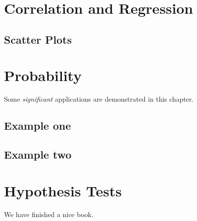 \documentclass[]{book}
\begin{document}
\hypertarget{corr}{%
\chapter{Correlation and Regression}\label{corr}}

\hypertarget{scatter-plots}{%
\section{Scatter Plots}\label{scatter-plots}}

\hypertarget{section}{%
\section{}\label{section}}

\hypertarget{probability}{%
\chapter{Probability}\label{probability}}

Some \emph{significant} applications are demonstrated in this chapter.

\hypertarget{example-one}{%
\section{Example one}\label{example-one}}

\hypertarget{example-two}{%
\section{Example two}\label{example-two}}

\hypertarget{hypothesis}{%
\chapter{Hypothesis Tests}\label{hypothesis}}

We have finished a nice book.


\end{document}
